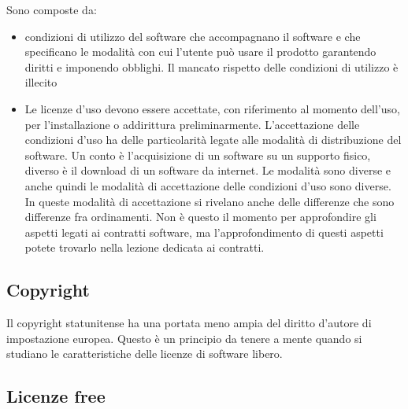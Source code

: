Sono composte da:

\begin{itemize}
    \item condizioni di utilizzo del software che accompagnano il software e che specificano le modalità con cui l'utente può usare il prodotto garantendo diritti e imponendo obblighi. Il mancato rispetto delle condizioni di utilizzo è illecito
    \item Le licenze d'uso devono essere accettate, con riferimento al momento dell'uso, per l'installazione o addirittura preliminarmente. L'accettazione delle condizioni d'uso ha delle particolarità legate alle modalità di distribuzione del software. Un conto è l'acquisizione di un software su un supporto fisico, diverso è il download di un software da internet. Le modalità sono diverse e anche quindi le modalità di accettazione delle condizioni d'uso sono diverse. In queste modalità di accettazione si rivelano anche delle differenze che sono differenze fra ordinamenti. Non è questo il momento per approfondire gli aspetti legati ai contratti software, ma l'approfondimento di questi aspetti potete trovarlo nella lezione dedicata ai contratti.
\end{itemize}

\subsection{Copyright}

Il copyright statunitense ha una portata meno ampia del diritto d'autore di impostazione europea. Questo è un principio da tenere a mente quando si studiano le caratteristiche delle licenze di software libero. 

\subsection{Licenze free}

